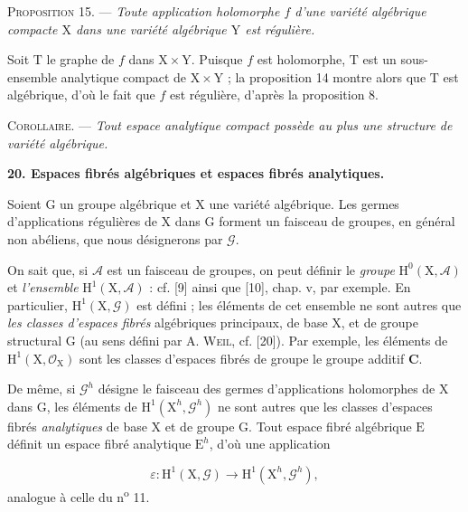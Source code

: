 \textsc{Proposition} 15. --- \textit{Toute application holomorphe $f$ d'une variété algébrique compacte $\mathrm{X}$ dans une variété algébrique $\mathrm{Y}$ est régulière.}



Soit $\mathrm{T}$ le graphe de $f$ dans $\mathrm{X} \times \mathrm{Y}$. Puisque $f$ est holomorphe, $\mathrm{T}$ est un sous-ensemble analytique compact de $\mathrm{X} \times \mathrm{Y}$ ; la proposition 14 montre alors que $\mathrm{T}$ est algébrique, d'où le fait que $f$ est régulière, d'après la proposition 8.

\textsc{Corollaire}. --- \textit{Tout espace analytique compact possède au plus une structure de variété algébrique.}


\textbf{20. Espaces fibrés algébriques et espaces fibrés analytiques.}

Soient $\mathrm{G}$ un groupe algébrique et $\mathrm{X}$ une variété algébrique. Les germes d'applications régulières de $\mathrm{X}$ dans $\mathrm{G}$ forment un faisceau de groupes, en général non abéliens, que nous désignerons par $\mathcal{G}$.

On sait que, si $\mathcal{A}$ est un faisceau de groupes, on peut définir le \textit{groupe} $\mathrm{H}^0(\mathrm{X}, \mathcal{A})$ et \textit{l'ensemble} $\mathrm{H}^1(\mathrm{X}, \mathcal{A})$ : cf. [9] ainsi que [10], chap. v, par exemple. En particulier, $\mathrm{H}^1(\mathrm{X}, \mathcal{G})$ est défini ; les éléments de cet ensemble ne sont autres que \textit{les classes d'espaces fibrés} algébriques principaux, de base $\mathrm{X}$, et de groupe structural $\mathrm{G}$ (au sens défini par A. \textsc{Weil}, cf. [20]). Par exemple, les éléments de $\mathrm{H}^1(\mathrm{X}, \mathcal{O}_\mathrm{X})$ sont les classes d'espaces fibrés de groupe le groupe additif $\mathbf{C}$.

De même, si $\mathcal{G}^h$ désigne le faisceau des germes d'applications holomorphes de $\mathrm{X}$ dans $\mathrm{G}$, les éléments de $\mathrm{H}^1(\mathrm{X}^h, \mathcal{G}^h)$ ne sont autres que les classes d'espaces fibrés \textit{analytiques} de base $\mathrm{X}$ et de groupe $\mathrm{G}$. Tout espace fibré algébrique $\mathrm{E}$ définit un espace fibré analytique $\mathrm{E}^h$, d'où une application

\begin{equation*}
\varepsilon : \mathrm{H}^1(\mathrm{X}, \mathcal{G}) \to \mathrm{H}^1(\mathrm{X}^h, \mathcal{G}^h),
\end{equation*}
analogue à celle du n\textsuperscript{o} 11.

